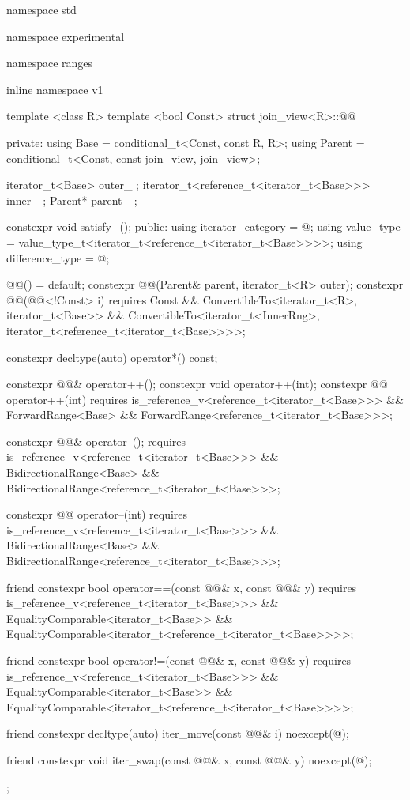 \begin{codeblock}
namespace std { namespace experimental { namespace ranges { inline namespace v1 {
template <class R>
  template <bool Const>
  struct join_view<R>::@@ {
  private:
    using Base = conditional_t<Const, const R, R>;
    using Parent = conditional_t<Const, const join_view, join_view>;

    iterator_t<Base> outer_ {};
    iterator_t<reference_t<iterator_t<Base>>> inner_ {};
    Parent* parent_ {};

    constexpr void satisfy_();
  public:
    using iterator_category = @\seebelow@;
    using value_type = value_type_t<iterator_t<reference_t<iterator_t<Base>>>>;
    using difference_type = @\seebelow@;

    @@() = default;
    constexpr @@(Parent& parent, iterator_t<R> outer);
    constexpr @@(@@<!Const> i) requires Const &&
        ConvertibleTo<iterator_t<R>, iterator_t<Base>> &&
        ConvertibleTo<iterator_t<InnerRng>,
            iterator_t<reference_t<iterator_t<Base>>>>;

    constexpr decltype(auto) operator*() const;

    constexpr @@& operator++();
    constexpr void operator++(int);
    constexpr @@ operator++(int)
        requires is_reference_v<reference_t<iterator_t<Base>>> &&
            ForwardRange<Base> &&
            ForwardRange<reference_t<iterator_t<Base>>>;

    constexpr @@& operator--();
        requires is_reference_v<reference_t<iterator_t<Base>>> &&
            BidirectionalRange<Base> &&
            BidirectionalRange<reference_t<iterator_t<Base>>>;

    constexpr @@ operator--(int)
        requires is_reference_v<reference_t<iterator_t<Base>>> &&
            BidirectionalRange<Base> &&
            BidirectionalRange<reference_t<iterator_t<Base>>>;

    friend constexpr bool operator==(const @@& x, const @@& y)
    requires is_reference_v<reference_t<iterator_t<Base>>> &&
        EqualityComparable<iterator_t<Base>> &&
        EqualityComparable<iterator_t<reference_t<iterator_t<Base>>>>;

    friend constexpr bool operator!=(const @@& x, const @@& y)
    requires is_reference_v<reference_t<iterator_t<Base>>> &&
        EqualityComparable<iterator_t<Base>> &&
        EqualityComparable<iterator_t<reference_t<iterator_t<Base>>>>;

    friend constexpr decltype(auto) iter_move(const @@& i)
        noexcept(@\seebelow@);

    friend constexpr void iter_swap(const @@& x, const @@& y)
        noexcept(@\seebelow@);
  };
}}}}
\end{codeblock}

